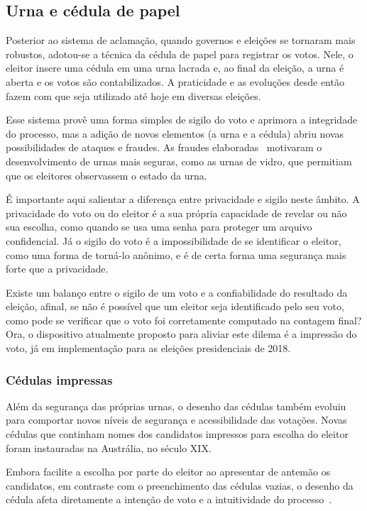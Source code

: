 \subsection{Urna e cédula de papel}

Posterior ao sistema de aclamação, quando governos e eleições se tornaram mais
robustos, adotou-se a técnica da cédula de papel para registrar os votos. Nele,
o eleitor insere uma cédula em uma urna lacrada e, ao final da eleição, a urna
é aberta e os votos são contabilizados. A praticidade e as evoluções desde
então fazem com que seja utilizado até hoje em diversas eleições.

Esse sistema provê uma forma simples de sigilo do voto e aprimora a integridade
do processo, mas a adição de novos elementos (a urna e a cédula) abriu novas
possibilidades de ataques e fraudes. As fraudes elaboradas~\nocite{leslie1856}
motivaram o desenvolvimento de urnas mais seguras, como as urnas de vidro, que
permitiam que os eleitores observassem o estado da urna.

É importante aqui salientar a diferença entre privacidade e sigilo neste
âmbito. A privacidade do voto ou do eleitor é a sua própria capacidade de
revelar ou não sua escolha, como quando se usa uma senha para proteger um
arquivo confidencial. Já o sigilo do voto é a impossibilidade de se identificar
o eleitor, como uma forma de torná-lo anônimo, e é de certa forma uma segurança
mais forte que a privacidade.

Existe um balanço entre o sigilo de um voto e a confiabilidade do resultado da
eleição, afinal, se não é possível que um eleitor seja identificado pelo seu
voto, como pode se verificar que o voto foi corretamente computado na contagem
final? Ora, o dispositivo atualmente proposto para aliviar este dilema é a
impressão do voto, já em implementação para as eleições presidenciais de 2018.

\subsubsection{Cédulas impressas}

Além da segurança das próprias urnas, o desenho das cédulas também evoluiu para
comportar novos níveis de segurança e acessibilidade das votações. Novas
cédulas que continham nomes dos candidatos impressos para escolha do eleitor
foram instauradas na Austrália, no século XIX.

Embora facilite a escolha por parte do eleitor ao apresentar de antemão os
candidatos, em contraste com o preenchimento das cédulas vazias, o desenho da
cédula afeta diretamente a intenção de voto e a intuitividade do
processo~\cite{everett2006measuring}.

